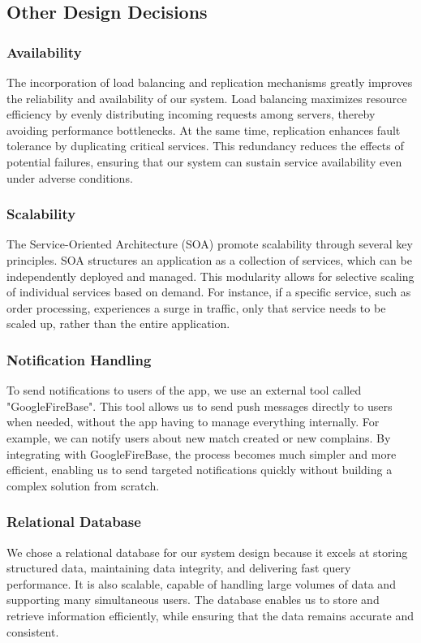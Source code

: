 \documentclass{article}
\begin{document}
\subsection{Other Design Decisions}
\subsubsection{Availability}
The incorporation of load balancing and replication mechanisms greatly improves the reliability and availability of our system. Load balancing maximizes resource efficiency by evenly distributing incoming requests among servers, thereby avoiding performance bottlenecks. At the same time, replication enhances fault tolerance by duplicating critical services. This redundancy reduces the effects of potential failures, ensuring that our system can sustain service availability even under adverse conditions.

\subsubsection{Scalability}
The Service-Oriented Architecture (SOA) promote scalability through several key principles. SOA structures an application as a collection of services, which can be independently deployed and managed. This modularity allows for selective scaling of individual services based on demand. For instance, if a specific service, such as order processing, experiences a surge in traffic, only that service needs to be scaled up, rather than the entire application.

\subsubsection{Notification Handling}
To send notifications to users of the app, we use an external tool called "GoogleFireBase". This tool allows us to send push messages directly to users when needed, without the app having to manage everything internally. For example, we can notify users about new match created or new complains. By integrating with GoogleFireBase, the process becomes much simpler and more efficient, enabling us to send targeted notifications quickly without building a complex solution from scratch.

\subsubsection{Relational Database}
We chose a relational database for our system design because it excels at storing structured data, maintaining data integrity, and delivering fast query performance. It is also scalable, capable of handling large volumes of data and supporting many simultaneous users. The database enables us to store and retrieve information efficiently, while ensuring that the data remains accurate and consistent.
\end{document}
